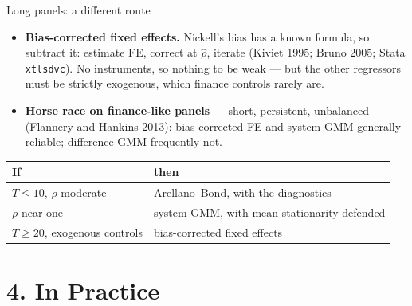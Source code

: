 \documentclass[
  11pt,
  ignorenonframetext,
  aspectratio=169,
]{beamer}
\providecommand{\tightlist}{%
  \setlength{\itemsep}{0pt}\setlength{\parskip}{0pt}}
\begin{document}
\begin{frame}[fragile]{Long panels: a different route}
\protect{}\label{long-panels-a-different-route}
\begin{itemize}
\tightlist
\item
  \textbf{Bias-corrected fixed effects.} Nickell's bias has a known
  formula, so subtract it: estimate FE, correct at \(\hat\rho\), iterate
  (Kiviet 1995; Bruno 2005; Stata \texttt{xtlsdvc}). No instruments, so
  nothing to be weak --- but the other regressors must be strictly
  exogenous, which finance controls rarely are.
\item
  \textbf{Horse race on finance-like panels} --- short, persistent,
  unbalanced (Flannery and Hankins 2013): bias-corrected FE and system
  GMM generally reliable; difference GMM frequently not.
\end{itemize}

\vspace{0.3em}

\begin{center}\small
\begin{tabular}{ll}
\toprule
If & then \\
\midrule
$T \le 10$, $\rho$ moderate & Arellano--Bond, with the diagnostics \\
$\rho$ near one & system GMM, with mean stationarity defended \\
$T \ge 20$, exogenous controls & bias-corrected fixed effects \\
\bottomrule
\end{tabular}
\end{center}
\end{frame}

\section{4. In Practice}\label{in-practice}
\end{document}
